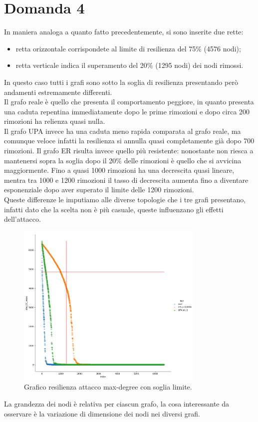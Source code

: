 \documentclass{article}
\begin{document}
\section*{Domanda 4}
In maniera analoga a quanto fatto precedentemente, si sono inserite due rette:
\begin{itemize}
	\item retta orizzontale corrispondete al limite di resilienza del 75\% (4576 nodi);
	\item retta verticale indica il superamento del 20\% (1295 nodi) dei nodi rimossi. 
\end{itemize}
In questo caso tutti i grafi sono sotto la soglia di resilienza presentando però andamenti estremamente differenti.\\
Il grafo reale è quello che presenta il comportamento peggiore, in quanto presenta una caduta repentina immediatamente dopo le prime rimozioni e dopo circa 200 rimozioni ha relienza quasi nulla.\\
Il grafo UPA invece ha una caduta meno rapida comparata al grafo reale, ma comunque veloce infatti la resilienza si annulla quasi completamente già dopo 700 rimozioni.
Il grafo ER risulta invece quello più resistente: nonostante non riesca a mantenersi sopra la soglia dopo il 20\% delle rimozioni è quello che si avvicina maggiormente. Fino a quasi 1000 rimozioni ha una decrescita quasi lineare, mentra tra 1000 e 1200 rimozioni il tasso di decrescita aumenta fino a diventare esponenziale dopo aver superato il limite delle 1200 rimozioni.\\
Queste differenze le imputiamo alle diverse topologie che i tre grafi presentano, infatti dato che la scelta non è più casuale, queste influenzano gli effetti dell'attacco.\\

\begin{figure}[H]
	\centering
	\includegraphics[width=0.80\textwidth]{figures/figure_maxdegree_line}
	\caption{Grafico resilienza attacco max-degree con soglia limite.}
\end{figure}
\newpage
\noindent La grandezza dei nodi è relativa per ciascun grafo, la cosa interessante da osservare è la variazione di dimensione dei nodi nei diversi grafi.
\end{document}
